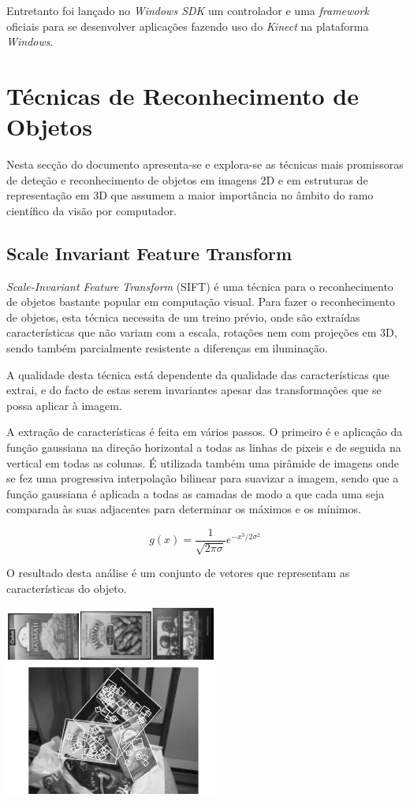 Entretanto foi lançado no \emph{Windows SDK} um controlador e uma \emph{framework} oficiais para se desenvolver aplicações fazendo uso do \emph{Kinect} na plataforma \emph{Windows}.


\section{Técnicas de Reconhecimento de Objetos}\label{objdetect}

Nesta secção do documento apresenta-se e explora-se as técnicas mais
promissoras de deteção e reconhecimento de objetos em imagens 2D e
em estruturas de representação em 3D que assumem a maior importância 
no âmbito do ramo científico da visão por computador.

\subsection[SIFT]{Scale Invariant Feature Transform}\label{sift}

\emph{Scale-Invariant Feature Transform} (SIFT) \cite{Lowe:1999:ORL:850924.851523} é uma técnica para o reconhecimento de objetos bastante popular em computação visual. Para fazer o reconhecimento de objetos, esta técnica necessita de um treino prévio, onde são extraídas características que não variam com a escala, rotações nem com projeções em 3D, sendo também parcialmente resistente a diferenças em iluminação.

A qualidade desta técnica está dependente da qualidade das características que extrai, e do facto de estas serem invariantes apesar das transformações que se possa aplicar à imagem.

A extração de características é feita em vários passos. O primeiro é e
aplicação da função gaussiana na direção horizontal a todas as linhas de pixeis
 e de seguida na vertical em todas as colunas.
É utilizada também uma pirâmide de imagens onde se fez uma progressiva interpolação bilinear para suavizar a imagem, sendo que  a função gaussiana é aplicada a
todas as camadas de modo a que cada uma seja comparada às suas adjacentes
para determinar os máximos e os mínimos.

\[
g(x) = \frac{1}{\sqrt{2\pi\sigma}}e^{-x^3 / 2 \sigma^2}
\]

O resultado desta análise é um conjunto de vetores que representam as
características do objeto. 


\begin{center}
	\includegraphics[scale=1.00]{figures/sift_img.png}
	\label{fig:1}
\end{center}

